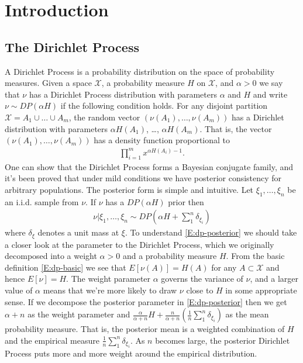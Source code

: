 \documentclass[letterpaper,11pt]{article}
\begin{document}
\section{Introduction}

\subsection{The Dirichlet Process}

A Dirichlet Process is a probability distribution on the space of probability measures. Given a space $\mathcal X$, a probability measure $H$ on $\mathcal X$, and $\alpha > 0$ we say that $\nu$ has a Dirichlet Process distribution with parameters $\alpha$ and $H$ and write $\nu \sim DP(\alpha H)$ if the following condition holds. For any disjoint partition $\mathcal X = A_1 \cup \dots \cup A_m$, the random vector $\left( \nu(A_1), \dots, \nu(A_m) \right)$ has a Dirichlet distribution with parameters $\alpha H(A_1)$, \dots, $\alpha H(A_m)$. That is, the vector $(\nu(A_1), \dots, \nu(A_m))$ has a density function proportional to
\begin{align}\label{E:dp-basic}
    \prod_{i=1}^m x^{\alpha H(A_i) - 1}.
\end{align}
One can show that the Dirichlet Process forms a Bayesian conjugate family, and it's been proved that under mild conditions we have posterior consistency for arbitrary populations. The posterior form is simple and intuitive. Let $\xi_1, \dots, \xi_n$ be an i.i.d. sample from $\nu$. If $\nu$ has a $DP(\alpha H)$ prior then
\begin{align}\label{E:dp-posterior}
    \nu | \xi_1, \dots, \xi_n \sim DP\left(\alpha H + \sum_1^n \delta_{\xi_i}\right)
\end{align}
where $\delta_\xi$ denotes a unit mass at $\xi$. To understand \eqref{E:dp-posterior} we should take a closer look at the parameter to the Dirichlet Process, which we originally decomposed into a weight $\alpha > 0$ and a probability measure $H$. From the basic definition \eqref{E:dp-basic} we see that $E [\nu(A)] = H(A)$ for any $A \subset \mathcal X$ and hence $E[\nu] = H$. The weight parameter $\alpha$ governs the variance of $\nu$, and a larger value of $\alpha$ means that we're more likely to draw $\nu$ close to $H$ in some appropriate sense. If we decompose the posterior parameter in \eqref{E:dp-posterior} then we get $\alpha + n$ as the weight parameter and $\frac{\alpha}{\alpha + n}H + \frac{n}{\alpha + n} \left( \frac{1}{n}\sum_1^n \delta_{\xi_i} \right)$ as the mean probability measure. That is, the posterior mean is a weighted combination of $H$ and the empirical measure $\frac{1}{n}\sum_1^n \delta_{\xi_i}$. As $n$ becomes large, the posterior Dirichlet Process puts more and more weight around the empirical distribution.
\end{document}
